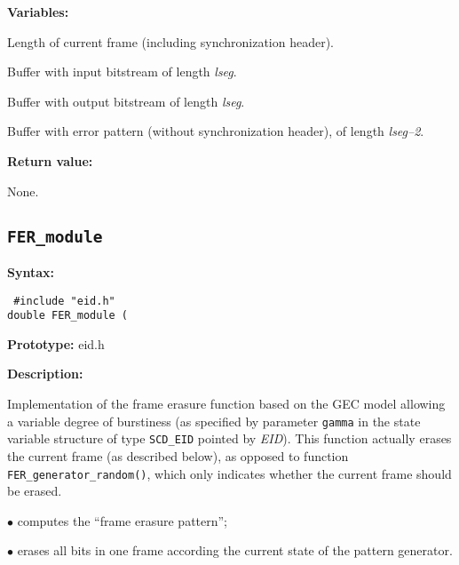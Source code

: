 {\bf Variables: }
\begin{Descr}{40mm}
\item[\pbox{20mm}{\em lseg}] %
            Length of current frame (including synchronization
            header). \smallskip

\item[\pbox{20mm}{\em xbuff}] %
            Buffer with input bitstream of length {\em lseg}.\smallskip

\item[\pbox{20mm}{\em ybuff}] %
            Buffer with output bitstream of length {\em lseg}.\smallskip

\item[\pbox{25mm}{\em error\_pattern}] %
            Buffer with error pattern (without synchronization header),
            of length {\em lseg--2}.
\end{Descr}

{\bf Return value: }

        None.

\subsection{{\tt FER\_module}}

{\bf Syntax: }

{\tt
\#include "eid.h"\\
double FER\_module (
}

{\bf Prototype: }    eid.h

{\bf Description: }

Implementation of the frame erasure function based on the GEC model
allowing a variable degree of burstiness (as specified by parameter
{\tt gamma} in the state variable structure of type {\tt SCD\_EID}
pointed by {\em EID}). This function actually erases the current frame (as
described below), as opposed to function {\tt
FER\_generator\_random()}, which only indicates whether the current
frame should be erased.

 \begin{minipage}{150mm}
        $\bullet$ computes the ``frame erasure pattern'';

        $\bullet$ erases all bits in one frame according the current
          state of the pattern generator.
\end{minipage}

